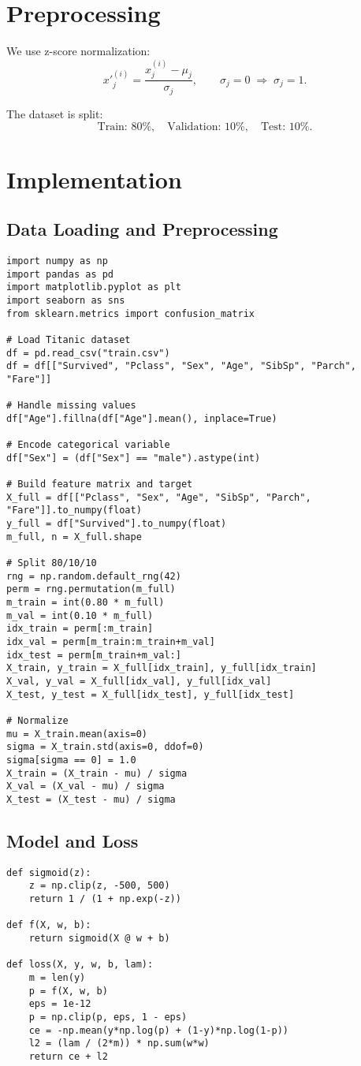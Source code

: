 \documentclass[12pt]{article}
\begin{document}
\section{Preprocessing}
We use z-score normalization:
\[
x'^{(i)}_j = \frac{x^{(i)}_j - \mu_j}{\sigma_j}, \qquad \sigma_j=0 \;\Rightarrow\; \sigma_j=1.
\]

The dataset is split:
\[
\text{Train: } 80\%, \quad
\text{Validation: } 10\%, \quad
\text{Test: } 10\%.
\]

\section{Implementation}
\subsection*{Data Loading and Preprocessing}
\begin{lstlisting}
import numpy as np
import pandas as pd
import matplotlib.pyplot as plt
import seaborn as sns
from sklearn.metrics import confusion_matrix

# Load Titanic dataset
df = pd.read_csv("train.csv")
df = df[["Survived", "Pclass", "Sex", "Age", "SibSp", "Parch", "Fare"]]

# Handle missing values
df["Age"].fillna(df["Age"].mean(), inplace=True)

# Encode categorical variable
df["Sex"] = (df["Sex"] == "male").astype(int)

# Build feature matrix and target
X_full = df[["Pclass", "Sex", "Age", "SibSp", "Parch", "Fare"]].to_numpy(float)
y_full = df["Survived"].to_numpy(float)
m_full, n = X_full.shape

# Split 80/10/10
rng = np.random.default_rng(42)
perm = rng.permutation(m_full)
m_train = int(0.80 * m_full)
m_val = int(0.10 * m_full)
idx_train = perm[:m_train]
idx_val = perm[m_train:m_train+m_val]
idx_test = perm[m_train+m_val:]
X_train, y_train = X_full[idx_train], y_full[idx_train]
X_val, y_val = X_full[idx_val], y_full[idx_val]
X_test, y_test = X_full[idx_test], y_full[idx_test]

# Normalize
mu = X_train.mean(axis=0)
sigma = X_train.std(axis=0, ddof=0)
sigma[sigma == 0] = 1.0
X_train = (X_train - mu) / sigma
X_val = (X_val - mu) / sigma
X_test = (X_test - mu) / sigma
\end{lstlisting}

\subsection*{Model and Loss}
\begin{lstlisting}
def sigmoid(z):
    z = np.clip(z, -500, 500)
    return 1 / (1 + np.exp(-z))

def f(X, w, b):
    return sigmoid(X @ w + b)

def loss(X, y, w, b, lam):
    m = len(y)
    p = f(X, w, b)
    eps = 1e-12
    p = np.clip(p, eps, 1 - eps)
    ce = -np.mean(y*np.log(p) + (1-y)*np.log(1-p))
    l2 = (lam / (2*m)) * np.sum(w*w)
    return ce + l2
\end{lstlisting}
\end{document}
